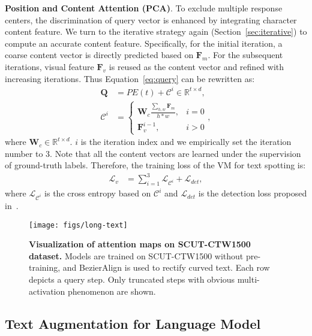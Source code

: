 \documentclass[10pt,journal,compsoc]{IEEEtran}
\begin{document}
\textbf{Position and Content Attention (PCA)}. To exclude multiple response centers, the discrimination of query vector is enhanced by integrating character content feature. We turn to the iterative strategy again (Section~\ref{sec:iterative}) to compute an accurate content feature. Specifically, for the initial iteration, a coarse content vector is directly predicted based on $\mathbf{F}_{m}$. For the subsequent iterations, visual feature $\mathbf{F}_{v}$ is reused as the content vector and refined with increasing iterations. Thus Equation~\ref{eq:query} can be rewritten as:
\begin{align}
\mathbf{Q} &= PE(t) + \mathcal{C}^{i}  \in \mathbb{R}^{t \times d}, \\
\mathcal{C}^{i} &= \begin{cases} \mathbf{W}_c \frac{\sum_{h,w}{\mathbf{F}_{m}}}{h*w}, & i = 0 \\ \mathbf{F}_{v}^{i-1}, & i > 0 \end{cases}, 
\end{align}
where $\mathbf{W}_c \in \mathbb{R}^{t \times d}$. $i$ is the iteration index and we empirically set the iteration number to 3. Note that all the content vectors are learned under the supervision of ground-truth labels. Therefore, the training loss of the VM for text spotting is:
\begin{align}
\mathcal{L}_v &= \sum^3_{i=1}{\mathcal{L}_{\mathcal{C}^{i}}} + \mathcal{L}_{det},
\end{align}
where $\mathcal{L}_{\mathcal{C}^{i}}$ is the cross entropy based on $\mathcal{C}^{i}$ and $\mathcal{L}_{det}$ is the detection loss proposed in~\cite{liu2020abcnetv2,liu2020abcnet}.


\begin{figure}
   \begin{center}
      \texttt{[image: figs/long-text]}
      \caption{\textbf{Visualization of attention maps on SCUT-CTW1500 dataset.} Models are trained on SCUT-CTW1500 without pre-training, and BezierAlign is used to rectify curved text. Each row depicts a query step. Only truncated steps with obvious multi-activation phenomenon are shown.}
      \label{fig:long-text}
   \end{center}
   \vspace{-1.5em}     
\end{figure}



\subsection{Text Augmentation for Language Model}
\label{sec:text-aug}
\end{document}
